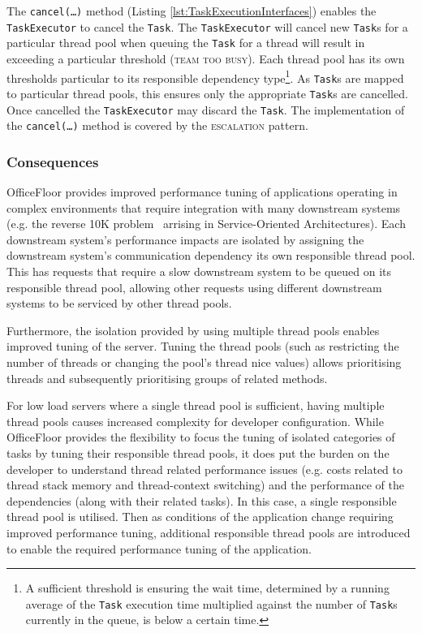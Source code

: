\documentclass[prodmode]{style/acmlarge}
\begin{document}
The \texttt{cancel(\ldots)} method (Listing \ref{lst:TaskExecutionInterfaces})
enables the \texttt{TaskExecutor} to cancel the \texttt{Task}. The
\texttt{Task\-Executor} will cancel new \texttt{Task}s for a particular thread
pool when queuing the \texttt{Task} for a thread will result in exceeding a
particular threshold (\textsc{team too busy}).  Each thread pool has its own
thresholds particular to its responsible dependency type\footnote{A sufficient
threshold is ensuring the wait time, determined by a running average of the
\texttt{Task} execution time multiplied against the number of \texttt{Task}s
currently in the queue, is below a certain time.}.  As \texttt{Task}s are mapped
to particular thread pools, this ensures only the appropriate \texttt{Task}s are
cancelled.  Once cancelled the \texttt{TaskExecutor} may discard the
\texttt{Task}.  The implementation of the \texttt{can\-cel(\ldots)} method is
covered by the \textsc{escalation} pattern.


\subsubsection*{Consequences}

OfficeFloor provides improved performance tuning of applications operating in
complex environments that require integration with many downstream systems (e.g.
the reverse 10K problem~\cite{reverse-ten-k-problem} arrising in
Service-Oriented Architectures).  Each downstream system's performance impacts
are isolated by assigning the downstream system's communication dependency its
own responsible thread pool.  This has requests that require a slow downstream
system to be queued on its responsible thread pool, allowing other requests
using different downstream systems to be serviced by other thread pools.

Furthermore, the isolation provided by using multiple thread pools enables
improved tuning of the server.  Tuning the thread pools (such as restricting the
number of threads or changing the pool's thread nice values) allows prioritising
threads and subsequently prioritising groups of related methods.

For low load servers where a single thread pool is sufficient, having multiple
thread pools causes increased complexity for developer configuration.  While
OfficeFloor provides the flexibility to focus the tuning of isolated categories
of tasks by tuning their responsible thread pools, it does put the burden on the
developer to understand thread related performance issues (e.g. costs related to
thread stack memory and thread-context switching) and the performance of the
dependencies (along with their related tasks).  In this case, a single
responsible thread pool is utilised.  Then as conditions of the application
change requiring improved performance tuning, additional responsible thread
pools are introduced to enable the required performance tuning of the
application.
\end{document}

